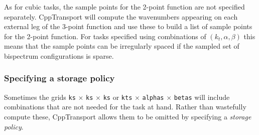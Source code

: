 \documentclass[11pt,a4paper]{article}
\newcommand{\packagefont}{\sffamily}
\newcommand{\CppTransport}{{\packagefont CppTransport}}
\begin{document}
As for cubic tasks, the sample points for the 2-point function are not specified separately.
{\CppTransport} will compute the wavenumbers appearing on each external leg of the
3-point function and use these to build a list of sample points for the 2-point function.
For tasks specified using combinations of $(k_t, \alpha, \beta)$ this means that the sample
points can be irregularly spaced if the sampled set of bispectrum configurations
is sparse.

\subsubsection{Specifying a storage policy}
\label{sec:storage-policy}
Sometimes the grids
\texttt{ks} $\times$ \texttt{ks} $\times$ \texttt{ks}
or
\texttt{kts} $\times$ \texttt{alphas} $\times$ \texttt{betas}
will include combinations that are not needed for the task at hand.
Rather than wastefully compute these, {\CppTransport} allows them to be omitted by
specifying a \emph{storage policy}.
\end{document}
